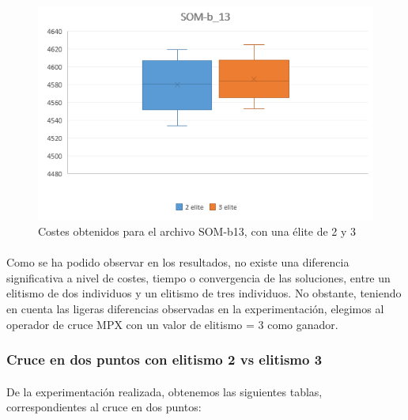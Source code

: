 	\begin{figure}[H]
		\centering
		\includegraphics[scale=0.7]{img/MPX_2vs3/SOM-b_13_Costes}
		\caption{Costes obtenidos para el archivo SOM-b13, con una élite de 2 y 3}
		\label{som-b13_coste}
		
		
	\end{figure}


	\paragraph{}Como se ha podido observar en los resultados, no existe una diferencia significativa a nivel de costes, tiempo o convergencia de las soluciones, entre un elitismo de dos individuos y un elitismo de tres individuos. No obstante, teniendo en cuenta las ligeras diferencias observadas en la experimentación, elegimos al operador de cruce MPX con un valor de elitismo = 3 como ganador.

	\subsubsection{Cruce en dos puntos con elitismo 2 vs elitismo 3}
	
	\paragraph{}De la experimentación realizada, obtenemos las siguientes tablas, correspondientes al cruce en dos puntos:
	

